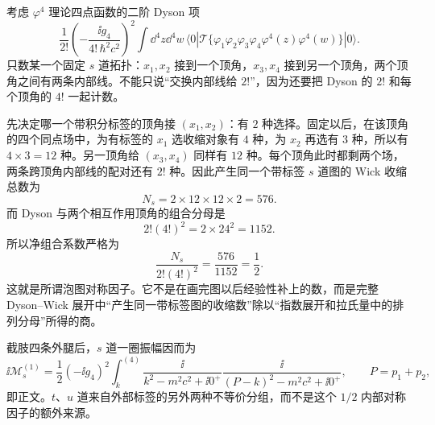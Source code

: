 \begin{derivation}
考虑 $\varphi^4$ 理论四点函数的二阶 Dyson 项
\begin{equation*}
 \frac{1}{2!}
 \left(-\frac{\ii g_4}{4!\,\hbar^2c^2}\right)^2
 \int\dd^4z\dd^4w\,
 \langle0|\mathcal T\{
 \varphi_1\varphi_2\varphi_3\varphi_4
 \varphi^4(z)\varphi^4(w)\}|0\rangle .
\end{equation*}
只数某一个固定 $s$ 道拓扑：$x_1,x_2$ 接到一个顶角，$x_3,x_4$ 接到另一个顶角，两个顶角之间有两条内部线。不能只说“交换内部线给 $2!$”，因为还要把 Dyson 的 $2!$ 和每个顶角的 $4!$ 一起计数。

先决定哪一个带积分标签的顶角接 $(x_1,x_2)$：有 $2$ 种选择。固定以后，在该顶角的四个同点场中，为有标签的 $x_1$ 选收缩对象有 $4$ 种，为 $x_2$ 再选有 $3$ 种，所以有 $4\times3=12$ 种。另一顶角给 $(x_3,x_4)$ 同样有 $12$ 种。每个顶角此时都剩两个场，两条跨顶角内部线的配对还有 $2!$ 种。因此产生同一个带标签 $s$ 道图的 Wick 收缩总数为
\begin{equation*}
 N_s=2\times12\times12\times2=576.
\end{equation*}
而 Dyson 与两个相互作用顶角的组合分母是
\begin{equation*}
 2!(4!)^2=2\times24^2=1152.
\end{equation*}
所以净组合系数严格为
\begin{equation*}
 \frac{N_s}{2!(4!)^2}=\frac{576}{1152}=\frac12.
\end{equation*}
这就是所谓泡图对称因子。它不是在画完图以后经验性补上的数，而是完整 Dyson--Wick 展开中“产生同一带标签图的收缩数”除以“指数展开和拉氏量中的排列分母”所得的商。

截肢四条外腿后，$s$ 道一圈振幅因而为
\begin{equation*}
 \ii\mathcal M_s^{(1)}
 =\frac12(-\ii g_4)^2
 \int_k^{(4)}
 \frac{\ii}{k^2-m^2c^2+\ii0^+}
 \frac{\ii}{(P-k)^2-m^2c^2+\ii0^+},
 \qquad P=p_1+p_2,
\end{equation*}
即正文。$t$、$u$ 道来自外部标签的另外两种不等价分组，而不是这个 $1/2$ 内部对称因子的额外来源。
\end{derivation}

